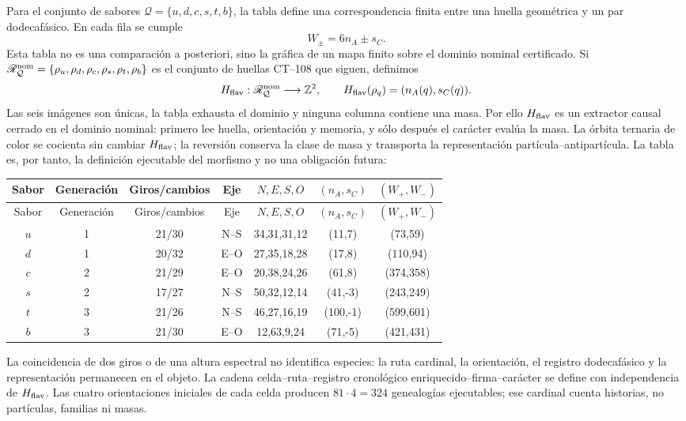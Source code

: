 Para el conjunto de sabores
\(\mathcal Q=\{u,d,c,s,t,b\}\), la tabla define una correspondencia finita
entre una huella geométrica y un par dodecafásico. En cada fila se cumple
\[
 W_\pm=6n_A\pm s_C.
\]
Esta tabla no es una comparación a posteriori, sino la gráfica de un mapa
finito sobre el dominio nominal certificado. Si
\(\mathscr R_{\mathcal Q}^{\rm nom}=\{\rho_u,\rho_d,\rho_c,\rho_s,\rho_t,\rho_b\}\)
es el conjunto de huellas CT--108 que siguen, definimos
\[
 H_{\rm flav}:\mathscr R_{\mathcal Q}^{\rm nom}\longrightarrow\mathbb Z^2,
 \qquad H_{\rm flav}(\rho_q)=(n_A(q),s_C(q)).
\]
Las seis imágenes son únicas, la tabla exhausta el dominio y ninguna columna
contiene una masa. Por ello \(H_{\rm flav}\) es un extractor causal cerrado en
el dominio nominal: primero lee huella, orientación y memoria, y sólo después
el carácter evalúa la masa. La órbita ternaria de color se cocienta sin cambiar
\(H_{\rm flav}\); la reversión conserva la clase de masa y transporta la
representación partícula--antipartícula. La tabla es, por tanto, la definición
ejecutable del morfismo y no una obligación futura:

\begin{longtable}{c c c c c c c}
\toprule
Sabor & Generación & Giros/cambios & Eje & \(N,E,S,O\)
& \((n_A,s_C)\) & \((W_+,W_-)\)\\
\midrule
\endfirsthead
\toprule
Sabor & Generación & Giros/cambios & Eje & \(N,E,S,O\)
& \((n_A,s_C)\) & \((W_+,W_-)\)\\
\midrule
\endhead
\(u\)&1&21/30&N--S&34,31,31,12&(11,7)&(73,59)\\
\(d\)&1&20/32&E--O&27,35,18,28&(17,8)&(110,94)\\
\(c\)&2&21/29&E--O&20,38,24,26&(61,8)&(374,358)\\
\(s\)&2&17/27&N--S&50,32,12,14&(41,-3)&(243,249)\\
\(t\)&3&21/26&N--S&46,27,16,19&(100,-1)&(599,601)\\
\(b\)&3&21/30&E--O&12,63,9,24&(71,-5)&(421,431)\\
\bottomrule
\end{longtable}

La coincidencia de dos giros o de una altura espectral no identifica
especies: la ruta cardinal, la orientación, el registro dodecafásico y la
representación permanecen en el objeto. La cadena
celda--ruta--registro cronológico enriquecido--firma--carácter se define con
independencia de \(H_{\rm flav}\). Las
cuatro orientaciones iniciales de cada celda producen
\(81\cdot4=324\) genealogías ejecutables; ese cardinal cuenta historias, no
partículas, familias ni masas.

